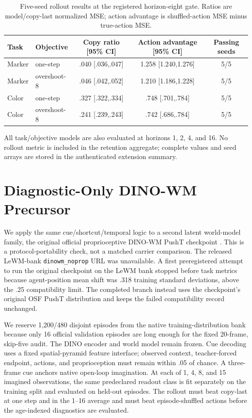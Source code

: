\begin{table}[H]
\centering
\scriptsize
\setlength{\tabcolsep}{4pt}
\caption{Five-seed rollout results at the registered horizon-eight gate. Ratios are model/copy-last normalized MSE; action advantage is shuffled-action MSE minus true-action MSE.}
\begin{tabular}{llccc}
\toprule
Task & Objective & Copy ratio [95\% CI] & Action advantage [95\% CI] & Passing seeds \\
\midrule
Marker & one-step & .040 [.036,.047] & 1.258 [1.240,1.276] & 5/5 \\
Marker & overshoot-8 & .046 [.042,.052] & 1.210 [1.186,1.228] & 5/5 \\
Color & one-step & .327 [.322,.334] & .748 [.701,.784] & 5/5 \\
Color & overshoot-8 & .241 [.239,.243] & .742 [.686,.784] & 5/5 \\
\bottomrule
\end{tabular}
\end{table}

All task/objective models are also evaluated at horizons 1, 2, 4, and 16. No rollout metric is included in the retention aggregate; complete values and seed arrays are stored in the authenticated extension summary.

\section{Diagnostic-Only DINO-WM Precursor}
\label{app:dinowm-precursor}
\label{app:dinowm}

We apply the same cue/shortcut/temporal logic to a second latent world-model family, the original official proprioceptive DINO-WM PushT checkpoint \citep{r_dinowm}. This is a protocol-portability check, not a matched carrier comparison. The released LeWM-bank \texttt{dinowm\_noprop} URL was unavailable. A first preregistered attempt to run the original checkpoint on the LeWM bank stopped before task metrics because agent-position mean shift was .318 training standard deviations, above the .25 compatibility limit. The completed branch instead uses the checkpoint's original OSF PushT distribution and keeps the failed compatibility record unchanged.

We reserve 1,200/480 disjoint episodes from the native training-distribution bank because only 16 official validation episodes are long enough for the fixed 20-frame, skip-five audit. The DINO encoder and world model remain frozen. Cue decoding uses a fixed spatial-pyramid feature interface; observed context, teacher-forced endpoint, actions, and proprioception must remain within .05 of chance. A three-frame cue anchors native open-loop imagination. At each of 1, 4, 8, and 15 imagined observations, the same predeclared readout class is fit separately on the training split and evaluated on held-out episodes. The rollout must beat copy-last at one step and in the 1--16 average and must beat episode-shuffled actions before the age-indexed diagnostics are evaluated.

